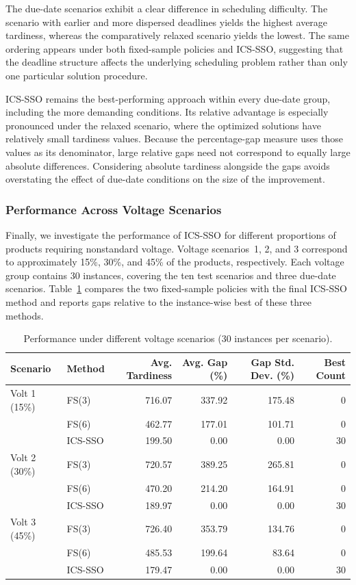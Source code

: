 \documentclass[11pt]{article}
\begin{document}
The due-date scenarios exhibit a clear difference in scheduling difficulty. The scenario with earlier and more dispersed deadlines yields the highest average tardiness, whereas the comparatively relaxed scenario yields the lowest. The same ordering appears under both fixed-sample policies and ICS-SSO, suggesting that the deadline structure affects the underlying scheduling problem rather than only one particular solution procedure.

ICS-SSO remains the best-performing approach within every due-date group, including the more demanding conditions. Its relative advantage is especially pronounced under the relaxed scenario, where the optimized solutions have relatively small tardiness values. Because the percentage-gap measure uses those values as its denominator, large relative gaps need not correspond to equally large absolute differences. Considering absolute tardiness alongside the gaps avoids overstating the effect of due-date conditions on the size of the improvement.

\subsubsection{Performance Across Voltage Scenarios}
\label{subsubsec:voltage_effect}

Finally, we investigate the performance of ICS-SSO for different proportions of products requiring nonstandard voltage. Voltage scenarios~1, 2, and 3 correspond to approximately 15\%, 30\%, and 45\% of the products, respectively. Each voltage group contains 30 instances, covering the ten test scenarios and three due-date scenarios. Table~\ref{tab:voltage_scenario_comparison} compares the two fixed-sample policies with the final ICS-SSO method and reports gaps relative to the instance-wise best of these three methods.

\begin{table}[H]
\centering
\caption{Performance under different voltage scenarios (30 instances per scenario).}
\label{tab:voltage_scenario_comparison}
\footnotesize
\setlength{\tabcolsep}{3.2pt}
\begin{tabular}{llrrrr}
\hline
\textbf{Scenario} & \textbf{Method} & \textbf{Avg. Tardiness} & \textbf{Avg. Gap (\%)} & \textbf{Gap Std. Dev. (\%)} & \textbf{Best Count} \\
\hline
Volt 1 (15\%) & FS(3) & 716.07 & 337.92 & 175.48 & 0 \\
 & FS(6) & 462.77 & 177.01 & 101.71 & 0 \\
 & ICS-SSO & 199.50 & 0.00 & 0.00 & 30 \\
\hline
Volt 2 (30\%) & FS(3) & 720.57 & 389.25 & 265.81 & 0 \\
 & FS(6) & 470.20 & 214.20 & 164.91 & 0 \\
 & ICS-SSO & 189.97 & 0.00 & 0.00 & 30 \\
\hline
Volt 3 (45\%) & FS(3) & 726.40 & 353.79 & 134.76 & 0 \\
 & FS(6) & 485.53 & 199.64 & 83.64 & 0 \\
 & ICS-SSO & 179.47 & 0.00 & 0.00 & 30 \\
\hline
\end{tabular}
\end{table}
\end{document}
